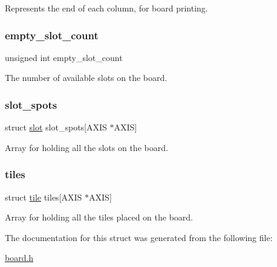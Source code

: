 Represents the end of each column, for board printing. \hypertarget{structboard_a7bf16d3c2cc54954ec3d5b52c0012733}{}\label{structboard_a7bf16d3c2cc54954ec3d5b52c0012733} 
\subsubsection{\texorpdfstring{empty\+\_\+slot\+\_\+count}{empty\_slot\_count}}
{\footnotesize\ttfamily unsigned int empty\+\_\+slot\+\_\+count}

The number of available slots on the board. \hypertarget{structboard_a0976bf1c9ed67dc54c53cd5e2bc004eb}{}\label{structboard_a0976bf1c9ed67dc54c53cd5e2bc004eb} 
\subsubsection{\texorpdfstring{slot\+\_\+spots}{slot\_spots}}
{\footnotesize\ttfamily struct \hyperlink{structslot}{slot} slot\+\_\+spots\mbox{[}A\+X\+IS $\ast$A\+X\+IS\mbox{]}}

Array for holding all the slots on the board. \hypertarget{structboard_a9a07d9c64ba17e22959b01a882af8f5a}{}\label{structboard_a9a07d9c64ba17e22959b01a882af8f5a} 
\subsubsection{\texorpdfstring{tiles}{tiles}}
{\footnotesize\ttfamily struct \hyperlink{structtile}{tile} tiles\mbox{[}A\+X\+IS $\ast$A\+X\+IS\mbox{]}}

Array for holding all the tiles placed on the board. 

The documentation for this struct was generated from the following file\+:\begin{DoxyCompactItemize}
\item 
\hyperlink{board_8h}{board.\+h}\end{DoxyCompactItemize}
